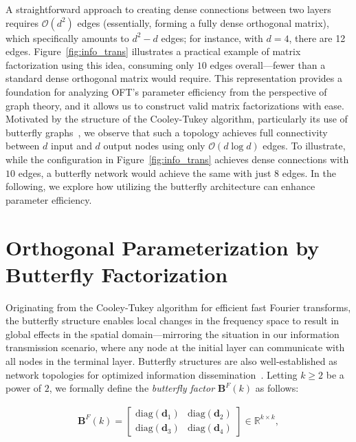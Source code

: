 A straightforward approach to creating dense connections between two layers requires $\mathcal{O}(d^2)$ edges (essentially, forming a fully dense orthogonal matrix), which specifically amounts to $d^2 - d$ edges; for instance, with $d=4$, there are 12 edges. Figure~\ref{fig:info_trans} illustrates a practical example of matrix factorization using this idea, consuming only $10$ edges overall—fewer than a standard dense orthogonal matrix would require. This representation provides a foundation for analyzing OFT’s parameter efficiency from the perspective of graph theory, and it allows us to construct valid matrix factorizations with ease. Motivated by the structure of the Cooley-Tukey algorithm, particularly its use of butterfly graphs~\cite{cooley1965algorithm}, we observe that such a topology achieves full connectivity between $d$ input and $d$ output nodes using only $\mathcal{O}(d\log d)$ edges. To illustrate, while the configuration in Figure~\ref{fig:info_trans} achieves dense connections with $10$ edges, a butterfly network would achieve the same with just $8$ edges. In the following, we explore how utilizing the butterfly architecture can enhance parameter efficiency.

\section{Orthogonal Parameterization by Butterfly Factorization}

Originating from the Cooley-Tukey algorithm for efficient fast Fourier transforms, the butterfly structure enables local changes in the frequency space to result in global effects in the spatial domain—mirroring the situation in our information transmission scenario, where any node at the initial layer can communicate with all nodes in the terminal layer. Butterfly structures are also well-established as network topologies for optimized information dissemination~\cite{solihin2015fundamentals,li2011linear}. Letting $k\geq 2$ be a power of $2$, we formally define the \emph{butterfly factor} $\bm{B}^F(k)$ as follows:

\begin{equation}\label{eq:but_factor}
\begin{aligned}
    \bm{B}^F(k)=\begin{bmatrix}
    \text{diag}(\bm{d}_1) & \text{diag}(\bm{d}_2) \\
    \text{diag}(\bm{d}_3) & \text{diag}(\bm{d}_4)
    \end{bmatrix}\in\mathbb{R}^{k\times k},
\end{aligned}
\end{equation}

